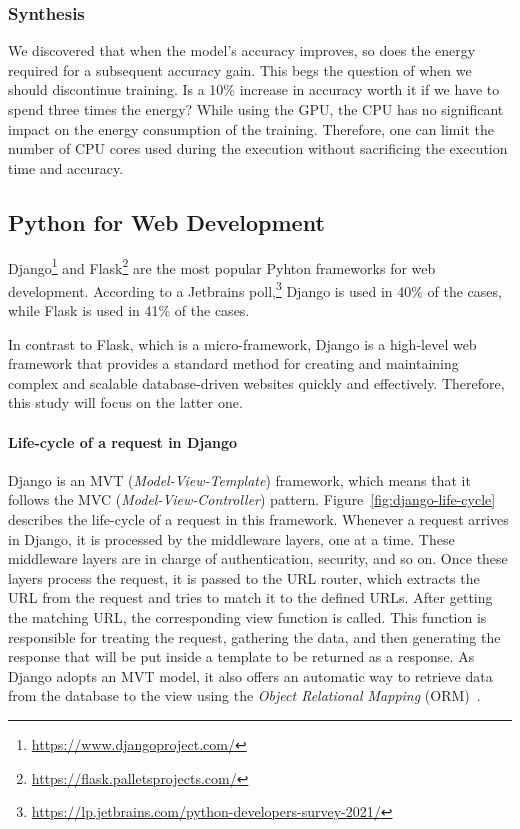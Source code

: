 \subsubsection{Synthesis}
We discovered that when the model's accuracy improves, so does the energy required for a subsequent accuracy gain.
This begs the question of when we should discontinue training.
Is a 10\% increase in accuracy worth it if we have to spend three times the energy?
While using the GPU, the CPU has no significant impact on the energy consumption of the training.
Therefore, one can limit the number of CPU cores used during the execution without sacrificing the execution time and accuracy.


\subsection{Python for Web Development}\label{sec:webdev}
Django\footnote{\url{https://www.djangoproject.com/}} and Flask\footnote{\url{https://flask.palletsprojects.com/}} are the most popular Pyhton frameworks for web development.
According to a Jetbrains poll,\footnote{\url{https://lp.jetbrains.com/python-developers-survey-2021/}} Django is used in 40\% of the cases, while Flask is used in 41\% of the cases.

In contrast to Flask, which is a micro-framework, Django is a high-level web framework that provides a standard method for creating and maintaining complex and scalable database-driven websites quickly and effectively.
Therefore, this study will focus on the latter one.

\paragraph{Life-cycle of a request in Django}
Django is an MVT (\emph{Model-View-Template}) framework, which means that it follows the MVC (\emph{Model-View-Controller}) pattern.
Figure~\ref{fig:django-life-cycle} describes the life-cycle of a request in this framework.
Whenever a request arrives in Django, it is processed by the middleware layers, one at a time.
These middleware layers are in charge of authentication, security, and so on.
Once these layers process the request, it is passed to the URL router, which extracts the URL from the request and tries to match it to the defined URLs.
After getting the matching URL, the corresponding view function is called.
This function is responsible for treating the request, gathering the data, and then generating the response that will be put inside a template to be returned as a response.
As Django adopts an MVT model, it also offers an automatic way to retrieve data from the database to the view using the \emph{Object Relational Mapping} (ORM)~\cite{o2008object}.

